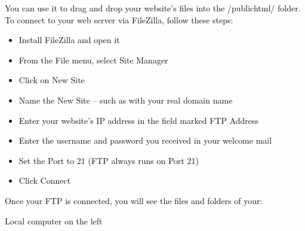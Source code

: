 \documentclass[12pt]{report}
\renewcommand{\_}{\kern-1.5pt\textunderscore\kern-1.5pt}
\begin{document}
\begin{adjustwidth}{1.18in}{0.7in}
\textcolor[HTML]{0D0D0D}{You can use it to drag and drop your website’s files into the /public\_html/ folder. To connect to your web server via FileZilla, follow these steps:}\par

\end{adjustwidth}

\begin{itemize}
	\item \textcolor[HTML]{0D0D0D}{Install FileZilla and open it}\par

	\item \textcolor[HTML]{0D0D0D}{From the File menu, select Site Manager}\par

	\item \textcolor[HTML]{0D0D0D}{Click on New Site}\par

	\item \textcolor[HTML]{0D0D0D}{Name the New Site – such as with your real domain name}\par

	\item \textcolor[HTML]{0D0D0D}{Enter your website’s IP address in the field marked FTP Address}\par

	\item \textcolor[HTML]{0D0D0D}{Enter the username and password you received in your welcome mail}\par

	\item \textcolor[HTML]{0D0D0D}{Set the Port to 21 (FTP always runs on Port 21)}\par

	\item \textcolor[HTML]{0D0D0D}{Click Connect}
\end{itemize}\par


\vspace{\baselineskip}\begin{adjustwidth}{1.18in}{0.0in}
\textcolor[HTML]{0D0D0D}{Once your FTP is connected, you will see the files and folders of your:}\par

\end{adjustwidth}

	\item \textcolor[HTML]{0D0D0D}{Local computer on the left}\par
\end{document}
